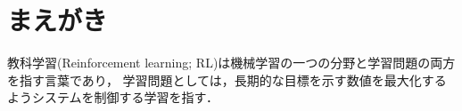\section{まえがき}
教科学習(Reinforcement learning; RL)は機械学習の一つの分野と学習問題の両方を指す言葉であり，
学習問題としては，長期的な目標を示す数値を最大化するようシステムを制御する学習を指す．
